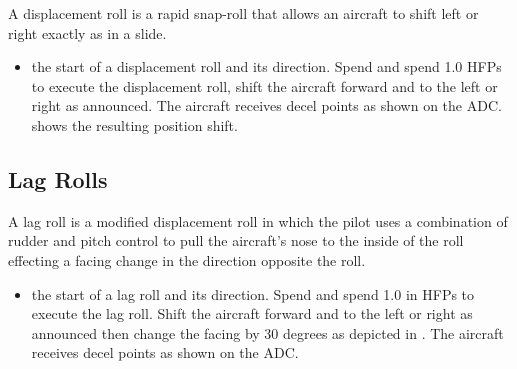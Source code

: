 A displacement roll is a rapid snap-roll that allows an aircraft to shift left or right exactly as in a slide.

\begin{itemize}
    \item{}  the start of a displacement roll and its direction. Spend  and spend 1.0 HFPs to execute the displacement roll, shift the aircraft forward and to the left or right as announced.  The aircraft receives decel points as shown on the ADC.  shows the resulting position shift.

\end{itemize}

\subsection{Lag Rolls}

A lag roll is a modified displacement roll in which the pilot uses a combination of rudder and pitch control to pull the aircraft's nose to the inside of the roll effecting a facing change in the direction opposite the roll.

\begin{itemize}
    \item{}  the start of a lag roll and its direction. Spend  and spend 1.0 in HFPs to execute the lag roll. Shift the aircraft forward and to the left or right as announced then change the facing by 30 degrees as depicted in  . The aircraft receives decel points as shown on the ADC.
\end{itemize}

